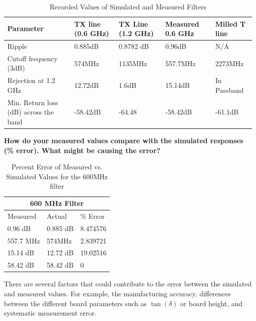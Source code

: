 \documentclass[journal]{IEEEtran}
\begin{document}
\begin{table}[hp]
    \centering
    \begin{tabularx}{0.5\textwidth}{XXXXX}
        \toprule
        Parameter                               & TX line (0.6   GHz) & TX Line (1.2   GHz) & Measured 0.6   GHz & Milled T line \\ \midrule
        Ripple                                  & 0.885dB             & 0.8782 dB           & 0.96dB             & N/A           \\ \midrule
        Cutoff   frequency (3dB)                & 574MHz              & 1135MHz             & 557.7MHz           & 2273MHz       \\ \midrule
        Rejection at   1.2 GHz                  & 12.72dB             & 1.6dB               & 15.14dB            & In Passband   \\ \midrule
        Min. Return   loss (dB) across the band & -58.42dB            & -64.48              & -58.42dB           & -61.1dB       \\ \bottomrule
    \end{tabularx}

    \vspace{1em}
    \caption{Recorded Values of Simulated and Measured Filters}
    \label{tab:records}
\end{table}



\textbf{How do your measured values compare with the simulated responses (\% error). What might be causing the error?}

\begin{table}[hp]
    \centering
    \begin{tabular}{lll}
        \toprule
        \multicolumn{3}{c}{600 MHz Filter} \\ \midrule
        Measured  & Actual   & \% Error    \\ \midrule
        0.96 dB   & 0.885 dB & 8.474576    \\ \midrule
        557.7 MHz & 574MHz   & 2.839721    \\ \midrule
        15.14 dB  & 12.72 dB & 19.02516    \\ \midrule
        58.42 dB  & 58.42 dB & 0           \\ \bottomrule
    \end{tabular}

    \vspace{1em}
    \caption{Percent Error of Measured vs. Simulated Values for the 600MHz filter}
    \label{tab:600_error}
\end{table}
There are several factors that could contribute to the error between the
simulated and measured values. For example, the manufacturing accuracy,
differences between the different board parameters such as \(\tan(\delta) \) or
board height, and systematic measurement error.
\end{document}
